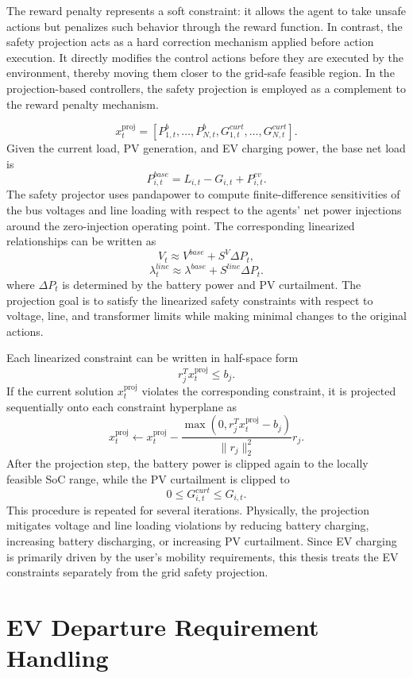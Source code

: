 The reward penalty represents a soft constraint: it allows the agent to take unsafe actions but penalizes such behavior through the reward function. In contrast, the safety projection acts as a hard correction mechanism applied before action execution. It directly modifies the control actions before they are executed by the environment, thereby moving them closer to the grid-safe feasible region. In the projection-based controllers, the safety projection is employed as a complement to the reward penalty mechanism.

\[
  x^{\mathrm{proj}}_t=
  [P^b_{1,t},\ldots,P^b_{N,t},
  G^{curt}_{1,t},\ldots,G^{curt}_{N,t}].
\]
Given the current load, PV generation, and EV charging power, the base net load is
\[
  P^{base}_{i,t}=L_{i,t}-G_{i,t}+P^{ev}_{i,t}.
\]
The safety projector uses pandapower to compute finite-difference sensitivities of the bus voltages and line loading with respect to the agents' net power injections around the zero-injection operating point. The corresponding linearized relationships can be written as
\[
  V_t \approx V^{base}+S^V\Delta P_t,
\]
\[
  \lambda^{line}_t \approx \lambda^{base}+S^{line}\Delta P_t.
\]
where \(\Delta P_t\) is determined by the battery power and PV curtailment. The projection goal is to satisfy the linearized safety constraints with respect to voltage, line, and transformer limits while making minimal changes to the original actions.

Each linearized constraint can be written in half-space form
\[
  r_j^T x^{\mathrm{proj}}_t \le b_j.
\]
If the current solution \(x^{\mathrm{proj}}_t\) violates the corresponding constraint, it is projected sequentially onto each constraint hyperplane as
\[
  x^{\mathrm{proj}}_t
  \leftarrow
  x^{\mathrm{proj}}_t
  -
  \frac{\max(0,r_j^Tx^{\mathrm{proj}}_t-b_j)}{\|r_j\|_2^2}r_j.
\]
After the projection step, the battery power is clipped again to the locally feasible SoC range, while the PV curtailment is clipped to
\[
  0\le G^{curt}_{i,t}\le G_{i,t}.
\]
This procedure is repeated for several iterations. Physically, the projection mitigates voltage and line loading violations by reducing battery charging, increasing battery discharging, or increasing PV curtailment. Since EV charging is primarily driven by the user's mobility requirements, this thesis treats the EV constraints separately from the grid safety projection.

\section{EV Departure Requirement Handling}

